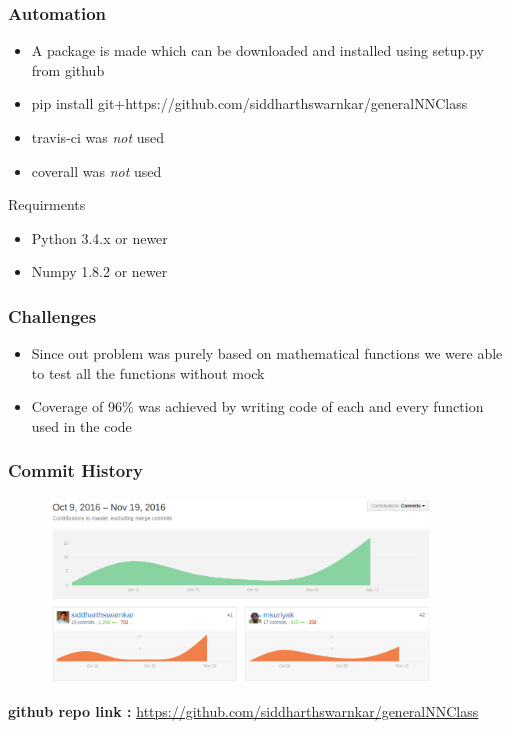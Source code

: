 \documentclass[10pt]{beamer}
\begin{document}
\begin{frame}
\frametitle{Automation}
\begin{block}{}
\begin{itemize}
\item{A package is made which can be downloaded and installed using setup.py from github}
\item{pip install git+https://github.com/siddharthswarnkar/generalNNClass}
\item{travis-ci was \emph{not} used}
\item{coverall was \emph{not} used}
\end{itemize}
\end{block}
\begin{block}{Requirments}
\begin{itemize}
\item{Python 3.4.x or newer}
\item{Numpy 1.8.2 or newer}
\end{itemize}
\end{block}
\end{frame}

\begin{frame}
\frametitle{Challenges}
\begin{itemize}
\item{Since out problem was purely based on mathematical functions we were able to test all the functions without mock}
\item{Coverage of 96\% was achieved by writing code of each and every function used in the code}
\end{itemize}
\end{frame}

\begin{frame}
\frametitle{Commit History}
\begin{figure}[h]
\includegraphics[width=0.9\textwidth, height=0.6\textheight]{commits.png}
\end{figure}
\vspace{0cm}
\textbf{github repo link :} 
\url{https://github.com/siddharthswarnkar/generalNNClass}
\end{frame} 
\end{document}
